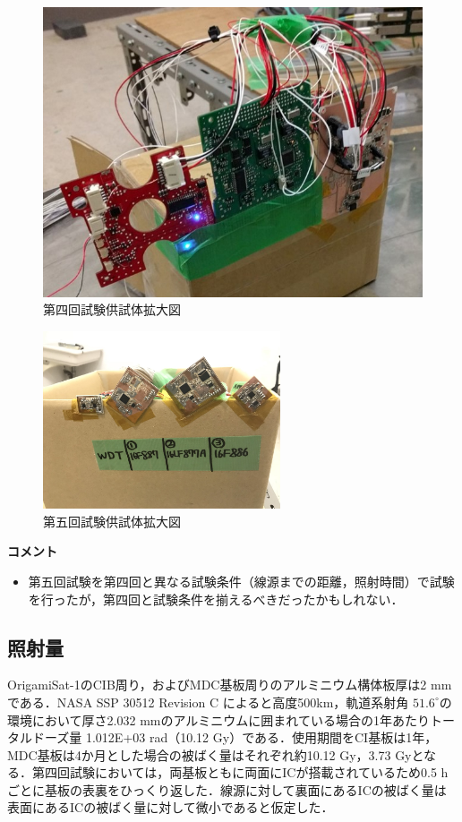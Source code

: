 \begin{figure}[htbp]
	\centering
	\includegraphics[scale=0.9]{04/fig/4-1-2.jpg}
	\caption{第四回試験供試体拡大図}
	\label{fig4-1-2}
\end{figure}

\begin{figure}[htbp]
	\centering
	\includegraphics[width=70mm]{04/fig/4-1-4.jpg}
	\caption{第五回試験供試体拡大図}
	\label{fig4-1-4}
\end{figure}


\vspace{2ex} 
\textbf{コメント}
\begin{itemize}
	\item 第五回試験を第四回と異なる試験条件（線源までの距離，照射時間）で試験を行ったが，第四回と試験条件を揃えるべきだったかもしれない．
\end{itemize}



\subsection{照射量}
OrigamiSat-1のCIB周り，およびMDC基板周りのアルミニウム構体板厚は2 mmである．NASA SSP 30512 Revision C によると高度500km，軌道系射角 $51.6 ^{\circ}$の環境において厚さ2.032 mmのアルミニウムに囲まれている場合の1年あたりトータルドーズ量 1.012E+03 rad（10.12 Gy）である．使用期間をCI基板は1年，MDC基板は4か月とした場合の被ばく量はそれぞれ約10.12 Gy，3.73 Gyとなる．第四回試験においては，両基板ともに両面にICが搭載されているため0.5 hごとに基板の表裏をひっくり返した．線源に対して裏面にあるICの被ばく量は表面にあるICの被ばく量に対して微小であると仮定した．

